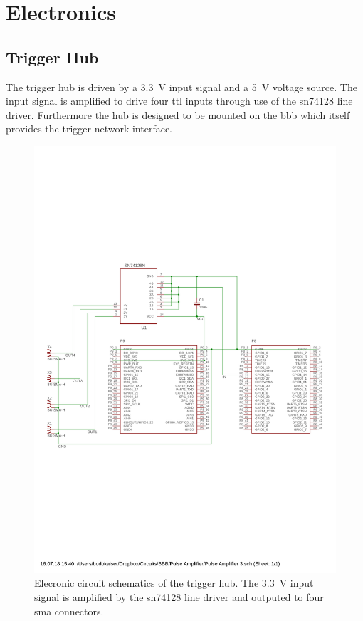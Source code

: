 \chapter{Electronics}

\section{Trigger Hub}
\label{app:electronics:trigger_hub}

The trigger hub is driven by a \SI{3.3}{\volt} input signal and a
\SI{5}{\volt} voltage source. The input signal is amplified to drive four
\gls{ttl} inputs through use of the \gls{sn74128} \cite{SN74128} line driver.
Furthermore the hub is designed to be mounted on the \gls{bbb} which itself
provides the trigger network interface.

\begin{figure}[h]
  \centering
  \captionsetup{width=.8\textwidth}
  \includegraphics[width=\textwidth]{images/circuits/line-driver/schematic.pdf}
  \caption{Elecronic circuit schematics of the trigger hub. The
    \SI{3.3}{\volt} input signal is amplified by the \gls{sn74128} line
    driver and outputed to four \gls{sma} connectors.}
\end{figure}


